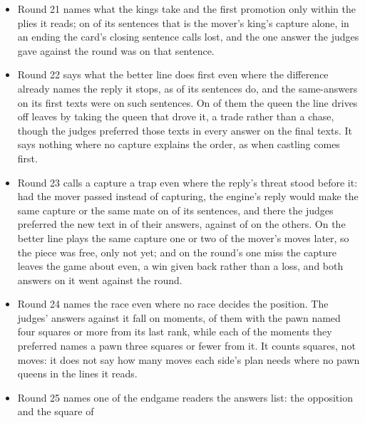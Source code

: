 \documentclass[11pt]{article}
\begin{document}
\begin{itemize}[nosep]
\RoundTwentyJudged{} judged sentences are such, and two of the three moments the judges held
against the round among them.
\item Round 21 names what the kings take and the first promotion only within the plies it reads; on
\RoundTwentyOneLostCapture{} of its \RoundTwentyOneJudged{} sentences that is the mover's king's
capture alone, in an ending the card's closing sentence calls lost, and the one answer the judges
gave against the round was on that sentence.
\item Round 22 says what the better line does first even where the difference already names the
reply it stops, as \RoundTwentyTwoRepeats{} of its \RoundTwentyTwoJudged{} sentences do, and the
\RoundTwentyTwoFirstSames{} same-answers on its first texts were on such sentences. On
\RoundTwentyTwoTrades{} of them the queen the line drives off leaves by taking the queen that drove
it, a trade rather than a chase, though the judges preferred those texts in every answer on the
final texts. It says nothing where no capture explains the order, as when castling comes first.
\item Round 23 calls a capture a trap even where the reply's threat stood before it: had the mover
passed instead of capturing, the engine's reply would make the same capture or the same mate on
\RoundTwentyThreeStood{} of its \RoundTwentyThreeJudged{} sentences, and there the judges preferred
the new text in \RoundTwentyThreeStoodNew{} of their \RoundTwentyThreeStoodAnswers{} answers, against
\RoundTwentyThreeRestNew{} of \RoundTwentyThreeRestAnswers{} on the others. On \RoundTwentyThreeLater{}
the better line plays the same capture one or two of the mover's moves later, so the piece was
free, only not yet; and on the round's one miss the capture leaves the game about even, a win given
back rather than a loss, and both answers on it went against the round.
\item Round 24 names the race even where no race decides the position. The judges'
\RoundTwentyFourAgainstAnswers{} answers against it fall on \RoundTwentyFourAgainst{} moments,
\RoundTwentyFourAgainstFar{} of them with the pawn named four squares or more from its last rank,
while each of the \RoundTwentyFourPreferred{} moments they preferred names a pawn three squares or
fewer from it. It counts squares, not moves: it does not say how many moves each side's plan needs
where no pawn queens in the lines it reads.
\item Round 25 names one of the endgame readers the answers list: the opposition and the square of

\end{itemize}
\end{document}
